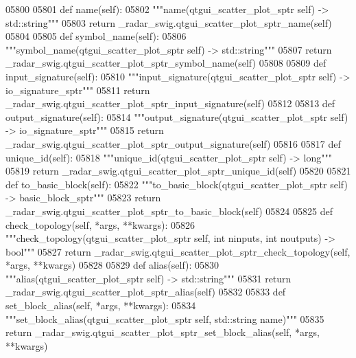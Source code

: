 \begin{DoxyCode}
{{{{{{{{{{{{{{{{{{{05800 
05801     \textcolor{keyword}{def }name(self):
05802         \textcolor{stringliteral}{"""name(qtgui\_scatter\_plot\_sptr self) -> std::string"""}
05803         \textcolor{keywordflow}{return} \_radar\_swig.qtgui\_scatter\_plot\_sptr\_name(self)
05804 
05805     \textcolor{keyword}{def }symbol_name(self):
05806         \textcolor{stringliteral}{"""symbol\_name(qtgui\_scatter\_plot\_sptr self) -> std::string"""}
05807         \textcolor{keywordflow}{return} \_radar\_swig.qtgui\_scatter\_plot\_sptr\_symbol\_name(self)
05808 
05809     \textcolor{keyword}{def }input_signature(self):
05810         \textcolor{stringliteral}{"""input\_signature(qtgui\_scatter\_plot\_sptr self) -> io\_signature\_sptr"""}
05811         \textcolor{keywordflow}{return} \_radar\_swig.qtgui\_scatter\_plot\_sptr\_input\_signature(self)
05812 
05813     \textcolor{keyword}{def }output_signature(self):
05814         \textcolor{stringliteral}{"""output\_signature(qtgui\_scatter\_plot\_sptr self) -> io\_signature\_sptr"""}
05815         \textcolor{keywordflow}{return} \_radar\_swig.qtgui\_scatter\_plot\_sptr\_output\_signature(self)
05816 
05817     \textcolor{keyword}{def }unique_id(self):
05818         \textcolor{stringliteral}{"""unique\_id(qtgui\_scatter\_plot\_sptr self) -> long"""}
05819         \textcolor{keywordflow}{return} \_radar\_swig.qtgui\_scatter\_plot\_sptr\_unique\_id(self)
05820 
05821     \textcolor{keyword}{def }to_basic_block(self):
05822         \textcolor{stringliteral}{"""to\_basic\_block(qtgui\_scatter\_plot\_sptr self) -> basic\_block\_sptr"""}
05823         \textcolor{keywordflow}{return} \_radar\_swig.qtgui\_scatter\_plot\_sptr\_to\_basic\_block(self)
05824 
05825     \textcolor{keyword}{def }check_topology(self, *args, **kwargs):
05826         \textcolor{stringliteral}{"""check\_topology(qtgui\_scatter\_plot\_sptr self, int ninputs, int noutputs) -> bool"""}
05827         \textcolor{keywordflow}{return} \_radar\_swig.qtgui\_scatter\_plot\_sptr\_check\_topology(self, *args, **kwargs)
05828 
05829     \textcolor{keyword}{def }alias(self):
05830         \textcolor{stringliteral}{"""alias(qtgui\_scatter\_plot\_sptr self) -> std::string"""}
05831         \textcolor{keywordflow}{return} \_radar\_swig.qtgui\_scatter\_plot\_sptr\_alias(self)
05832 
05833     \textcolor{keyword}{def }set_block_alias(self, *args, **kwargs):
05834         \textcolor{stringliteral}{"""set\_block\_alias(qtgui\_scatter\_plot\_sptr self, std::string name)"""}
05835         \textcolor{keywordflow}{return} \_radar\_swig.qtgui\_scatter\_plot\_sptr\_set\_block\_alias(self, *args, **kwargs)
}}}}}}}}}}}}}}}}}}}
\end{DoxyCode}
